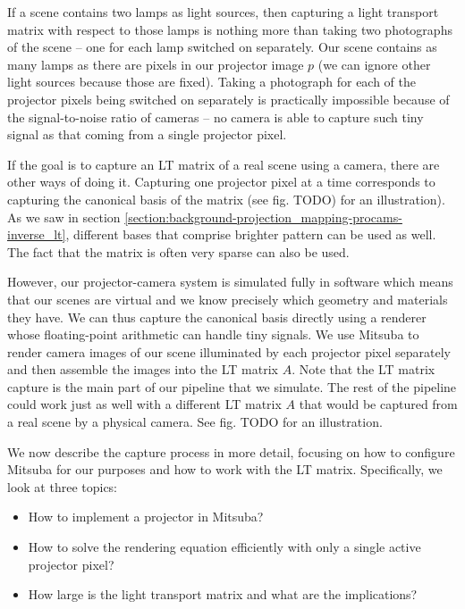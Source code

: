 If a scene contains two lamps as light sources, then capturing a light transport matrix with respect to those lamps is nothing more than taking two photographs of the scene -- one for each lamp switched on separately. Our scene contains as many lamps as there are pixels in our projector image \(p\) (we can ignore other light sources because those are fixed). Taking a photograph for each of the projector pixels being switched on separately is practically impossible because of the signal-to-noise ratio of cameras -- no camera is able to capture such tiny signal as that coming from a single projector pixel.

If the goal is to capture an LT matrix of a real scene using a camera, there are other ways of doing it. Capturing one projector pixel at a time corresponds to capturing the canonical basis of the matrix (see fig. {\color{red} TODO}) for an illustration). As we saw in section \ref{section:background-projection_mapping-procams-inverse_lt}, different bases that comprise brighter pattern can be used as well. The fact that the matrix is often very sparse can also be used.

However, our projector-camera system is simulated fully in software which means that our scenes are virtual and we know precisely which geometry and materials they have. We can thus capture the canonical basis directly using a renderer whose floating-point arithmetic can handle tiny signals. We use Mitsuba to render camera images of our scene illuminated by each projector pixel separately and then assemble the images into the LT matrix \(A\). Note that the LT matrix capture is the main part of our pipeline that we simulate. The rest of the pipeline could work just as well with a different LT matrix \(A\) that would be captured from a real scene by a physical camera. See fig. {\color{red} TODO} for an illustration.

We now describe the capture process in more detail, focusing on how to configure Mitsuba for our purposes and how to work with the LT matrix. Specifically, we look at three topics:

\begin{itemize}
    \item How to implement a projector in Mitsuba?
    \item How to solve the rendering equation efficiently with only a single active projector pixel?
    \item How large is the light transport matrix and what are the implications?
\end{itemize}

